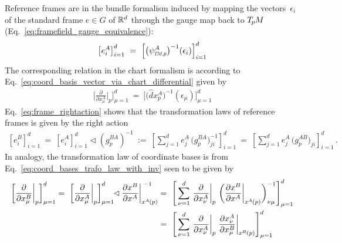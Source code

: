 Reference frames are in the bundle formalism induced by mapping the vectors~$\epsilon_i$ of the standard frame $e\in G$ of $\mathbb{R}^d$ through the gauge map back to $T_{\mkern-1.5mu p}\mkern-.5muM$ (Eq.~\ref{eq:framefield_gauge_equivalence}):
\begin{align}
    \big[ e_i^A \big]_{i=1}^d\ =\ \Big[ \big(\psiTMp^A \big)^{-1} (\epsilon_i) \Big]_{i=1}^d
\end{align}
The corresponding relation in the chart formalism is according to Eq.~\eqref{eq:coord_basis_vector_via_chart_differential} given by 
\begin{align}
    \bigg[ \frac{\partial}{\partial x^A_\mu} \bigg|_p \bigg]_{\mu=1}^d\ =\ \Big[ \big(\hat{d}x_p^A \big)^{-1} (\epsilon_\mu) \Big]_{\mu=1}^d
\end{align}
Eq.~\eqref{eq:frame_rightaction} shows that the transformation laws of reference frames is given by the right action
\begin{align}\label{eq:trafo_law_comparison_basis_gauge}
    \left[e_{i}^B\right]_{i=1}^d
    \  =\ \left[ e_{i}^A \right]_{i=1}^d \!\lhd \left(g_p^{BA}\right)^{-1}
    \ :=\ \left[ \sum\nolimits_{j=1}^d e_{j}^A\, \big(g_p^{BA}\big)^{-1}_{ji} \right]_{i=1}^d
    \ =\ \left[ \sum\nolimits_{j=1}^d e_{j}^A\, \big(g_p^{AB}\big)_{ji} \right]_{i=1}^d \,.
\end{align}
In analogy, the transformation law of coordinate bases is from Eq.~\eqref{eq:coord_bases_trafo_law_with_inv} seen to be given by
\begin{align}\label{eq:trafo_law_comparison_basis_chart}
    \bigg[\frac{\partial}{\partial x^B_\mu} \bigg|_p \bigg]_{\mu=1}^d
    =\ \bigg[\frac{\partial}{\partial x^A_\mu} \bigg|_p \bigg]_{\mu=1}^d \mkern-6mu\lhd \frac{\partial x^B}{\partial x^A} \bigg|_{x^{\mkern-1muA}\mkern-1mu(p)}^{\;-1}
    &=\ \Bigg[ \sum_{\nu=1}^d \,
            \frac{\partial        }{\partial x^A_\nu} \bigg|_p \ 
            \bigg( \frac{\partial x^B}{\partial x^A} \bigg|_{x^{\mkern-1muA}\mkern-1mu(p)} \bigg)^{-1}_{\nu\mu}
          \Bigg]_{\mu=1}^d 
    \notag \\
    &=\ \Bigg[ \sum_{\nu=1}^d \,
            \frac{\partial        }{\partial x^A_\nu} \bigg|_p \ 
            \frac{\partial x^A_\nu}{\partial x^B_\mu} \bigg|_{x^{\mkern-1muB}\mkern-1mu(p)}
          \Bigg]_{\mu=1}^d 
\end{align}











